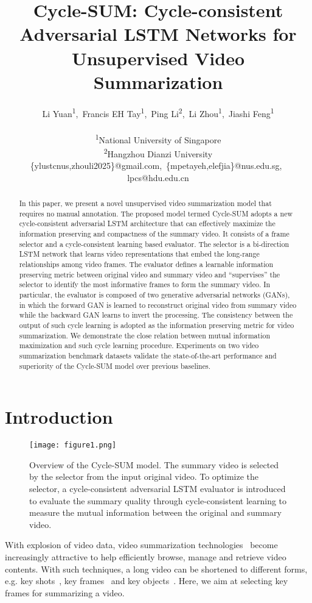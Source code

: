 \documentclass[letterpaper]{article} \usepackage{aaai19}  \usepackage{times}  \usepackage{helvet}  \usepackage{courier}  \usepackage{url}  \usepackage{graphicx}  \frenchspacing  \setlength{\pdfpagewidth}{8.5in}  \setlength{\pdfpageheight}{11in}  \usepackage{amsmath}
\title{Cycle-SUM: Cycle-consistent Adversarial LSTM Networks for Unsupervised Video Summarization}
\author{Li Yuan\textsuperscript{\rm 1},\, Francis EH Tay\textsuperscript{\rm 1},\, Ping Li\textsuperscript{\rm 2},\, Li Zhou\textsuperscript{\rm 1},\, Jiashi Feng\textsuperscript{\rm 1}\\\\
\textsuperscript{\rm 1}National University of Singapore\\
\textsuperscript{\rm 2}Hangzhou Dianzi University\\
{\{ylustcnus,zhouli2025\}@gmail.com},\,
 {\{mpetayeh,elefjia\}@nus.edu.sg}, \,
 {lpcs@hdu.edu.cn}
}
\begin{document}
\maketitle
\begin{abstract}
In this paper, we present a novel unsupervised video summarization model that requires no manual annotation. The proposed model termed Cycle-SUM adopts a new cycle-consistent adversarial LSTM architecture that can effectively maximize the information preserving and  compactness of the summary video. It consists of a frame selector and a cycle-consistent learning based evaluator. The selector is a bi-direction LSTM network that learns video representations that embed the long-range relationships among video frames. The evaluator defines a learnable information preserving metric between original video and summary video and ``supervises'' the selector to identify the most informative frames to form the summary video.
In particular, the evaluator is composed of two generative adversarial networks (GANs), in which the forward GAN is learned to reconstruct original video from summary video while the backward GAN learns to invert the processing. The consistency between the output of such cycle learning is adopted as the information preserving metric for video summarization. We demonstrate the close relation between mutual information maximization and such cycle learning procedure. Experiments on two video summarization benchmark datasets validate the state-of-the-art performance and superiority of the Cycle-SUM model over previous baselines.
\end{abstract}
\section{Introduction}

\begin{figure}[!tp]
\centering
\texttt{[image: figure1.png]}  \caption{\footnotesize Overview of the Cycle-SUM model. The summary video is selected by the selector from the input original video. To optimize the selector, a cycle-consistent adversarial LSTM evaluator is introduced to evaluate the summary quality through cycle-consistent learning to measure the mutual information between the original and summary video.}
\label{fig:illustration}
\end{figure}



With explosion of video data, video summarization technologies~\cite{ma2002user,pritch2007webcam,lu2013story} become increasingly attractive to help efficiently browse, manage and retrieve video contents. With such techniques, a long video can be shortened to different forms, e.g. key shots~\cite{gygli2014creating}, key frames~\cite{kim2014joint} and key objects~\cite{meng2016keyframes}. Here, we aim at selecting key frames for summarizing a video.
\end{document}
